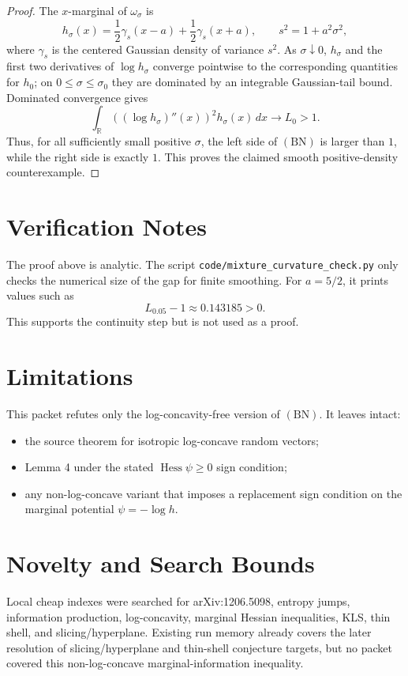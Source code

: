 \documentclass[11pt]{article}
\newcommand{\R}{\mathbb R}
\newcommand{\Hess}{\operatorname{Hess}}
\begin{document}
\begin{proof}
The \(x\)-marginal of \(\omega_\sigma\) is
\[
  h_\sigma(x)=
  \frac12\gamma_s(x-a)+\frac12\gamma_s(x+a),
  \qquad
  s^2=1+a^2\sigma^2,
\]
where \(\gamma_s\) is the centered Gaussian density of variance \(s^2\).  As
\(\sigma\downarrow0\), \(h_\sigma\) and the first two derivatives of
\(\log h_\sigma\) converge pointwise to the corresponding quantities for
\(h_0\); on \(0\leq\sigma\leq\sigma_0\) they are dominated by an integrable
Gaussian-tail bound.  Dominated convergence gives
\[
  \int_\R \left((\log h_\sigma)''(x)\right)^2h_\sigma(x)\,dx
  \longrightarrow L_0>1.
\]
Thus, for all sufficiently small positive \(\sigma\), the left side of
\((\mathrm{BN})\) is larger than \(1\), while the right side is exactly \(1\).
This proves the claimed smooth positive-density counterexample.
\end{proof}

\section*{Verification Notes}

The proof above is analytic.  The script
\texttt{code/mixture\_curvature\_check.py} only checks the numerical size of
the gap for finite smoothing.  For \(a=5/2\), it prints values such as
\[
  L_{0.05}-1 \approx 0.143185>0.
\]
This supports the continuity step but is not used as a proof.

\section*{Limitations}

This packet refutes only the log-concavity-free version of \((\mathrm{BN})\).
It leaves intact:
\begin{itemize}
\item the source theorem for isotropic log-concave random vectors;
\item Lemma 4 under the stated \(\Hess\psi\geq0\) sign condition;
\item any non-log-concave variant that imposes a replacement sign condition on
the marginal potential \(\psi=-\log h\).
\end{itemize}

\section*{Novelty and Search Bounds}

Local cheap indexes were searched for arXiv:1206.5098, entropy jumps,
information production, log-concavity, marginal Hessian inequalities, KLS,
thin shell, and slicing/hyperplane.  Existing run memory already covers the
later resolution of slicing/hyperplane and thin-shell conjecture targets, but
no packet covered this non-log-concave marginal-information inequality.
\end{document}
